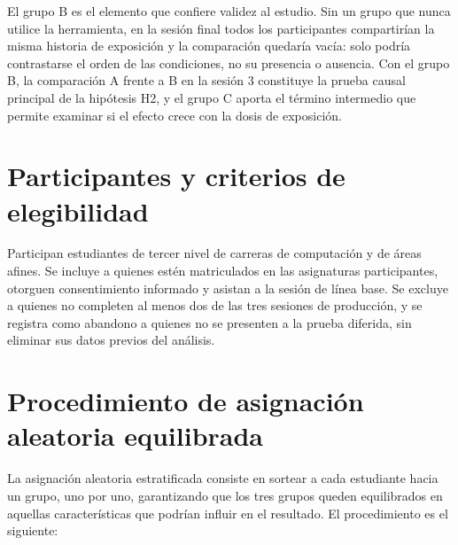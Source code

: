 \documentclass[12pt,a4paper,openany]{report}
\begin{document}
    El grupo B es el elemento que confiere validez al estudio. Sin un grupo que nunca utilice la herramienta, en la sesi\'on final todos los participantes compartir\'ian la misma historia de exposici\'on y la comparaci\'on quedar\'ia vac\'ia: solo podr\'ia contrastarse el orden de las condiciones, no su presencia o ausencia. Con el grupo B, la comparaci\'on A frente a B en la sesi\'on 3 constituye la prueba causal principal de la hip\'otesis H2, y el grupo C aporta el t\'ermino intermedio que permite examinar si el efecto crece con la dosis de exposici\'on.
    
    \section{Participantes y criterios de elegibilidad}
    
    Participan estudiantes de tercer nivel de carreras de computaci\'on y de \'areas afines. Se incluye a quienes est\'en matriculados en las asignaturas participantes, otorguen consentimiento informado y asistan a la sesi\'on de l\'inea base. Se excluye a quienes no completen al menos dos de las tres sesiones de producci\'on, y se registra como abandono a quienes no se presenten a la prueba diferida, sin eliminar sus datos previos del an\'alisis.
    
    \section{Procedimiento de asignaci\'on aleatoria equilibrada}
    \label{sec:asignacion}
    
    La asignaci\'on aleatoria estratificada consiste en sortear a cada estudiante hacia un grupo, uno por uno, garantizando que los tres grupos queden equilibrados en aquellas caracter\'isticas que podr\'ian influir en el resultado. El procedimiento es el siguiente:
    
\end{document}
